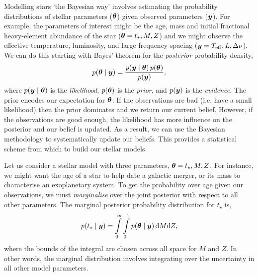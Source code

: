 
Modelling stars `the Bayesian way' involves estimating the probability distributions of stellar parameters (\(\bm{\theta}\)) given observed parameters (\(\bm{y}\)). For example, the parameters of interest might be the age, mass and initial fractional heavy-element abundance of the star (\(\bm{\theta} = t_\star, M, Z\)) and we might observe the effective temperature, luminosity, and large frequency spacing (\(\bm{y} = {T_\mathrm{eff}}, L, \Delta\nu\)). We can do this starting with Bayes' theorem for the \emph{posterior} probability density,
%
\begin{equation}
    p(\bm{\theta} \mid \bm{y}) = \frac{p(\bm{y} \mid \bm{\theta})\,p(\bm{\theta})}{p(\bm{y})},
\end{equation}
%
where \(p(\bm{y} \mid \bm{\theta})\) is the \emph{likelihood}, \(p(\bm{\theta})\) is the \emph{prior}, and \(p(\bm{y})\) is the \emph{evidence}. The prior encodes our expectation for \(\bm{\theta}\). If the observations are bad (i.e. have a small likelihood) then the prior dominates and we return our current belief. However, if the observations are good enough, the likelihood has more influence on the posterior and our belief is updated. As a result, we can use the Bayesian methodology to systematically update our beliefs. This provides a statistical scheme from which to build our stellar models.

Let us consider a stellar model with three parameters, \(\bm{\theta} = t_\star, M, Z\). For instance, we might want the age of a star to help date a galactic merger, or its mass to characterise an exoplanetary system. To get the probability over age given our observations, we must \emph{marginalise} over the joint posterior with respect to all other parameters. The marginal posterior probability distribution for \(t_\star\) is,
%
\begin{equation}
    p(t_\star \mid \bm{y}) = \int\limits_0^\infty \int\limits_0^1 p(\bm{\theta} \mid \bm{y}) \, \mathrm{d} M \mathrm{d} Z,
\end{equation}
%
where the bounds of the integral are chosen across all space for \(M\) and \(Z\). In other words, the marginal distribution involves integrating over the uncertainty in all other model parameters.

